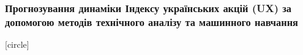 \documentclass[aspectratio=169]{beamer}
\begin{document}
\begin{frame}
\frametitle {Прогнозування динаміки Індексу українських акцій (UX) за допомогою методів технічного аналізу та машинного навчання}
[circle]
\tableofcontents
\end{frame}
\end{document}

